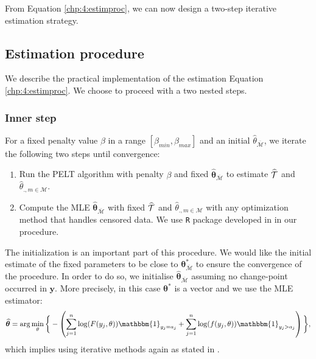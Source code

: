 From Equation \eqref{chp:4:estimproc}, we can now design a two-step iterative estimation strategy.

\subsection{Estimation procedure}\label{chp:4:3:2}


We describe the practical implementation of the estimation Equation \ref{chp:4:estimproc}. We choose to proceed with a two nested steps.

\subsubsection{Inner step}\label{chp:4:3:2:1}

For a fixed penalty value $\beta$ in a range $[\beta_{min},\beta_{max}]$ and an initial $\widehat{\theta}_{\overline{\mathcal{M}}}$, we iterate the following two steps until convergence: 
\begin{enumerate}
\item Run the PELT algorithm with penalty $\beta$ and fixed $\widehat{\bm\theta}_{{\overline{\mathcal{M}}}}$ to estimate $\widehat{{\mathcal T}}$ and $\widehat{\theta}_{.,m\in\mathcal{M}}$.
\item Compute the MLE $\widehat{\bm\theta}_{{\overline{\mathcal{M}}}}$ with fixed $\widehat{{\mathcal T}}$ and $\widehat{\theta}_{.,m\in\mathcal{M}}$ with any optimization method that handles censored data. We use \texttt{R} package developed in \cite{delignette2015} in our procedure.  
\end{enumerate} 

The initialization is an important part of this procedure. We would like the initial estimate of the fixed parameters to be close to $\bm\theta^*_{{\overline{\mathcal{M}}}}$ to ensure the convergence of the procedure. In order to do so, we initialise $\widehat{\bm\theta}_{\overline{\mathcal{M}}}$ assuming no change-point occurred in $\bm y$.  More precisely, in this case $\bm\theta^*$ is a vector and we use the MLE estimator:  
\begin{equation}\label{chp:4:init}
\widehat{\bm\theta} = \arg\min_{\theta}\bigg\{ - \left(\sum_{j=1}^{n}\log(F(y_j,\theta))\mathbbm{1}_{y_j=a_j}+\sum_{j=1}^{n}\log(f(y_j,\theta))\mathbbm{1}_{y_j>a_j}\right)\bigg\},
\end{equation}   
which implies using iterative methods again as stated in \cite{cohen1965maximum}.


